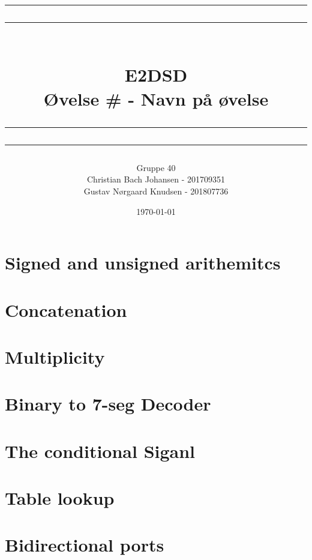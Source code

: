 \documentclass[12pt,a4paper]{article}
\newcommand\mymaketitle[1]{
   \rule{\textwidth}{1.6pt}\vspace*{-\baselineskip}\vspace*{2pt}
   \rule{\textwidth}{0.4pt}
   \\  
   \huge \bf #1\\
   \vspace{-8pt}
   \rule{\textwidth}{0.4pt}\vspace*{-\baselineskip}\vspace{3.2pt}
   \rule{\textwidth}{1.6pt}
}
\begin{document}
\title{
	\mymaketitle{E2DSD\\Øvelse \# - Navn på øvelse}
}
\author{
	Gruppe 40\\
	Christian Bach Johansen - 201709351\\
	Gustav Nørgaard Knudsen - 201807736
}
\date{\today}

\maketitle



\section{Signed and unsigned arithemitcs}

\newpage

\section{Concatenation}


\section{Multiplicity}


\section{Binary to 7-seg Decoder}


\section{The conditional Siganl}


\section{Table lookup}


\section{Bidirectional ports}

\end{document}
